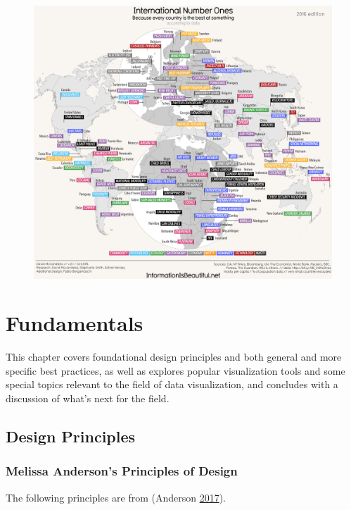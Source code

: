 \documentclass[]{book}
\theoremstyle{definition}
\theoremstyle{definition}
\theoremstyle{definition}
\theoremstyle{remark}
\begin{document}
\begin{figure}
\centering
\includegraphics{images/Number_ones.png}
\caption{}
\end{figure}

\chapter{Fundamentals}\label{fundamentals}

This chapter covers foundational design principles and both general and
more specific best practices, as well as explores popular visualization
tools and some special topics relevant to the field of data
visualization, and concludes with a discussion of what's next for the
field.

\section{Design Principles}\label{design-principles}

\subsection{Melissa Anderson's Principles of
Design}\label{melissa-andersons-principles-of-design}

The following principles are from (Anderson
\protect\hyperlink{ref-design_principles}{2017}).
\end{document}
